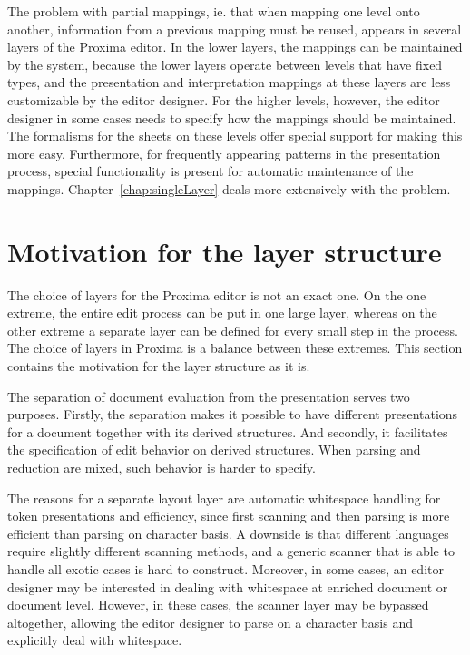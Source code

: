 The problem with partial mappings, ie. that when mapping one level onto another, information from a previous mapping must be reused, appears in several layers of the Proxima editor. In the lower layers, the mappings can be maintained by the system, because the lower layers operate between levels that have fixed types, and the presentation and interpretation mappings at these layers are less customizable by the editor designer. For the higher levels, however, the editor designer in some cases needs to specify how the mappings should be maintained. The formalisms for the sheets on these levels offer special support for making this more easy. Furthermore, for frequently appearing patterns in the presentation process, special functionality is present for automatic maintenance of the mappings. Chapter~\ref{chap:singleLayer} deals more extensively with the problem.


%																
%																
%																
\section{Motivation for the layer structure}

The choice of layers for the Proxima editor is not an exact one. On the one extreme, the entire edit process can be put in one large layer, whereas on the other extreme a separate layer can be defined for every small step in the process. The choice of layers in Proxima is a balance between these extremes. This section contains the motivation for the layer structure as it is.

The separation of document evaluation from the presentation serves two purposes. Firstly, the separation makes it possible to have different presentations for a document together with its derived structures. And secondly, it facilitates the specification of edit behavior on derived structures. When parsing and reduction are mixed, such behavior is harder to specify.

The reasons for a separate layout layer are automatic whitespace handling for token presentations and efficiency, since first scanning and then parsing is more efficient than parsing on character basis. A downside is that different languages require slightly different scanning methods, and a generic scanner that is able to handle all exotic cases is hard to construct. Moreover, in some cases, an editor designer may be interested in dealing with whitespace at enriched document or document level. However, in these cases, the scanner layer may be bypassed altogether, allowing the editor designer to parse on a character basis and explicitly deal with whitespace.


